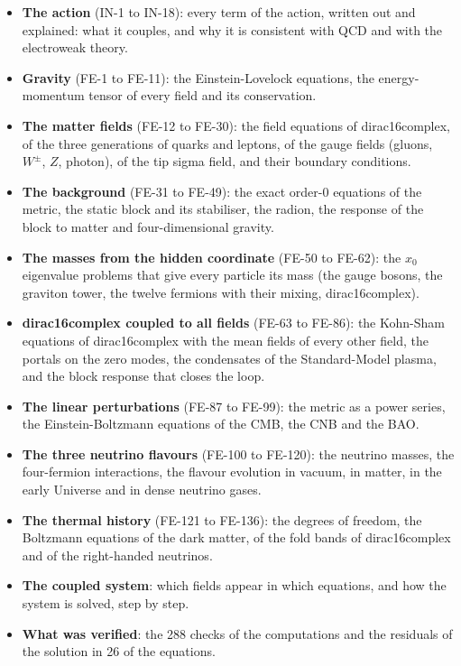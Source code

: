 \documentclass[
  10pt,
]{article}
\providecommand{\tightlist}{%
  \setlength{\itemsep}{0pt}\setlength{\parskip}{0pt}}
\begin{document}
\begin{itemize}
\tightlist
\item
  \textbf{The action} (IN-1 to IN-18): every term of the action, written
  out and explained: what it couples, and why it is consistent with QCD
  and with the electroweak theory.
\item
  \textbf{Gravity} (FE-1 to FE-11): the Einstein-Lovelock equations, the
  energy-momentum tensor of every field and its conservation.
\item
  \textbf{The matter fields} (FE-12 to FE-30): the field equations of
  dirac16complex, of the three generations of quarks and leptons, of the
  gauge fields (gluons, \(W^\pm\), \(Z\), photon), of the tip sigma
  field, and their boundary conditions.
\item
  \textbf{The background} (FE-31 to FE-49): the exact order-0 equations
  of the metric, the static block and its stabiliser, the radion, the
  response of the block to matter and four-dimensional gravity.
\item
  \textbf{The masses from the hidden coordinate} (FE-50 to FE-62): the
  \(x_0\) eigenvalue problems that give every particle its mass (the
  gauge bosons, the graviton tower, the twelve fermions with their
  mixing, dirac16complex).
\item
  \textbf{dirac16complex coupled to all fields} (FE-63 to FE-86): the
  Kohn-Sham equations of dirac16complex with the mean fields of every
  other field, the portals on the zero modes, the condensates of the
  Standard-Model plasma, and the block response that closes the loop.
\item
  \textbf{The linear perturbations} (FE-87 to FE-99): the metric as a
  power series, the Einstein-Boltzmann equations of the CMB, the CNB and
  the BAO.
\item
  \textbf{The three neutrino flavours} (FE-100 to FE-120): the neutrino
  masses, the four-fermion interactions, the flavour evolution in
  vacuum, in matter, in the early Universe and in dense neutrino gases.
\item
  \textbf{The thermal history} (FE-121 to FE-136): the degrees of
  freedom, the Boltzmann equations of the dark matter, of the fold bands
  of dirac16complex and of the right-handed neutrinos.
\item
  \textbf{The coupled system}: which fields appear in which equations,
  and how the system is solved, step by step.
\item
  \textbf{What was verified}: the 288 checks of the computations and the
  residuals of the solution in 26 of the equations.
\end{itemize}
\end{document}
